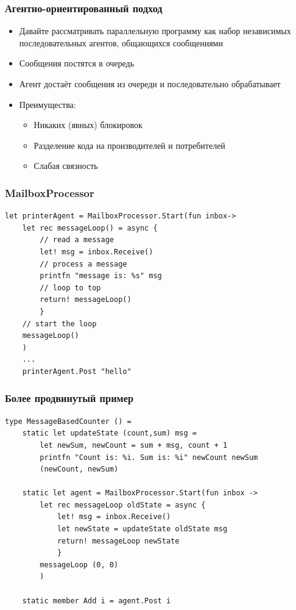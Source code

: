 \documentclass{../../slides-style}
\begin{document}
    \begin{frame}
        \frametitle{Агентно-ориентированный подход}
        \begin{itemize}
            \item Давайте рассматривать параллельную программу как набор независимых последовательных агентов, общающихся сообщениями
            \item Сообщения постятся в очередь
            \item Агент достаёт сообщения из очереди и последовательно обрабатывает
            \item Преимущества:
            \begin{itemize}
                \item Никаких (явных) блокировок
                \item Разделение кода на производителей и потребителей
                \item Слабая связность
            \end{itemize}
        \end{itemize}
    \end{frame}

    \begin{frame}[fragile]
        \frametitle{MailboxProcessor}
        \begin{verbatim}
let printerAgent = MailboxProcessor.Start(fun inbox->
    let rec messageLoop() = async {
        // read a message
        let! msg = inbox.Receive()
        // process a message
        printfn "message is: %s" msg
        // loop to top
        return! messageLoop()
        }
    // start the loop
    messageLoop()
    )
    ...
    printerAgent.Post "hello"
        \end{verbatim}
    \end{frame}

    \begin{frame}[fragile]
        \frametitle{Более продвинутый пример}
        \begin{verbatim}
type MessageBasedCounter () =
    static let updateState (count,sum) msg =
        let newSum, newCount = sum + msg, count + 1
        printfn "Count is: %i. Sum is: %i" newCount newSum
        (newCount, newSum)

    static let agent = MailboxProcessor.Start(fun inbox ->
        let rec messageLoop oldState = async {
            let! msg = inbox.Receive()
            let newState = updateState oldState msg
            return! messageLoop newState
            }
        messageLoop (0, 0)
        )

    static member Add i = agent.Post i
        \end{verbatim}
    \end{frame}
\end{document}
